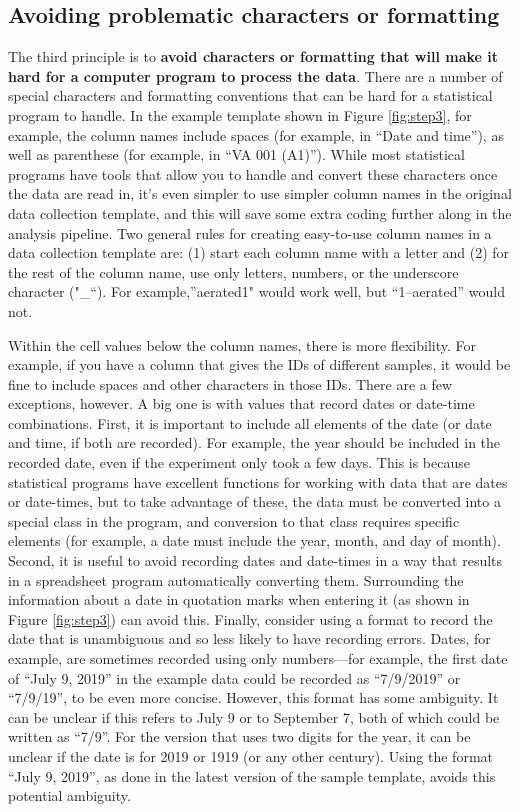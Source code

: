 \documentclass[]{tufte-book}
\begin{document}
\hypertarget{avoiding-problematic-characters-or-formatting}{%
\subsection{Avoiding problematic characters or formatting}\label{avoiding-problematic-characters-or-formatting}}

The third principle is to \textbf{avoid characters or formatting that will make it
hard for a computer program to process the data}. There are a number of special
characters and formatting conventions that can be hard for a statistical program to
handle. In the example template shown in Figure \ref{fig:step3}, for example,
the column names include spaces (for example, in ``Date and time''), as well as
parenthese (for example, in ``VA 001 (A1)''). While most statistical programs have
tools that allow you to handle and convert these characters once the data are
read in, it's even simpler to use simpler column names in the original data collection
template, and this will save some extra coding further along in the analysis pipeline.
Two general rules for creating easy-to-use column names in a data collection template
are: (1) start each column name with a letter and (2) for the rest of the column
name, use only letters, numbers, or the underscore character ("\_``). For example,''aerated1" would work well, but ``1--aerated'' would not.

Within the cell values below the column names, there is more flexibility. For example,
if you have a column that gives the IDs of different samples, it would be fine to include
spaces and other characters in those IDs. There are a few exceptions, however. A big one
is with values that record dates or date-time combinations. First, it is important to include
all elements of the date (or date and time, if both are recorded). For example, the year
should be included in the recorded date, even if the experiment only took a few days.
This is because statistical programs have excellent functions for working with data that
are dates or date-times, but to take advantage of these, the data must be converted into
a special class in the program, and conversion to that class requires specific elements
(for example, a date must include the year, month, and day of month). Second, it is
useful to avoid recording dates and date-times in a way that results in a spreadsheet
program automatically converting them. Surrounding the information about a date in
quotation marks when entering it (as shown in Figure \ref{fig:step3}) can avoid this.
Finally, consider using a format to record the date that is unambiguous and so less likely
to have recording errors. Dates, for example, are sometimes recorded using only numbers---for
example, the first date of ``July 9, 2019'' in the example data could be recorded as
``7/9/2019'' or ``7/9/19'', to be even more concise. However, this format has some ambiguity.
It can be unclear if this refers to July 9 or to September 7, both of which could be
written as ``7/9''. For the version that uses two digits for the year, it can be unclear
if the date is for 2019 or 1919 (or any other century). Using the format ``July 9, 2019'',
as done in the latest version of the sample template, avoids this potential ambiguity.
\end{document}
